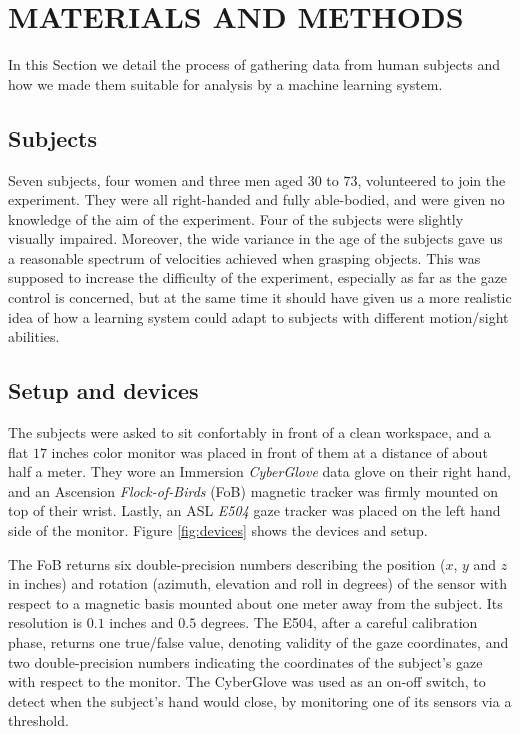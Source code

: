 \documentclass{article}
\begin{document}
\section{MATERIALS AND METHODS}
\label{sec:mat}

In this Section we detail the process of gathering data from human
subjects and how we made them suitable for analysis by a machine
learning system.

\subsection{Subjects}

Seven subjects, four women and three men aged $30$ to $73$,
volunteered to join the experiment. They were all right-handed and
fully able-bodied, and were given no knowledge of the aim of the
experiment. Four of the subjects were slightly visually
impaired. Moreover, the wide variance in the age of the subjects gave
us a reasonable spectrum of velocities achieved when grasping objects.
This was supposed to increase the difficulty of the experiment,
especially as far as the gaze control is concerned, but at the same
time it should have given us a more realistic idea of how a learning
system could adapt to subjects with different motion/sight abilities.

\subsection{Setup and devices}

The subjects were asked to sit confortably in front of a clean
workspace, and a flat $17$ inches color monitor was placed in front of
them at a distance of about half a meter. They wore an Immersion
\emph{CyberGlove} data glove \cite{cyberglove} on their right hand,
and an Ascension \emph{Flock-of-Birds} (FoB) \cite{fob} magnetic
tracker was firmly mounted on top of their wrist. Lastly, an ASL
\emph{E504} gaze tracker \cite{e504} was placed on the left hand side
of the monitor. Figure \ref{fig:devices} shows the devices and setup.

The FoB returns six double-precision numbers describing the position
($x$, $y$ and $z$ in inches) and rotation (azimuth, elevation and roll
in degrees) of the sensor with respect to a magnetic basis mounted
about one meter away from the subject. Its resolution is $0.1$ inches
and $0.5$ degrees. The E504, after a careful calibration phase,
returns one true/false value, denoting validity of the gaze
coordinates, and two double-precision numbers indicating the
coordinates of the subject's gaze with respect to the monitor. The
CyberGlove was used as an on-off switch, to detect when the subject's
hand would close, by monitoring one of its sensors via a threshold.
\end{document}
